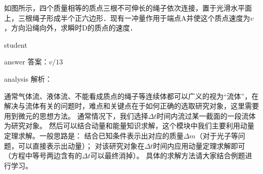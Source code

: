  
 \begin{example}
 	如图所示，四个质量相等的质点三根不可伸长的绳子依次连接，置于光滑水平面上，三根绳子形成半个正六边形．现有一冲量作用于端点A并使这个质点速度为$ v $，方向沿绳向外，求瞬时D的质点的速度．
 	
 	\begin{taggedblock}{student}
 		\vspace*{2cm}
 	\end{taggedblock}
 	
 	
 	\begin{taggedblock}{answer}
 		答案：$ v/13 $
 	\end{taggedblock}
 	
 	
 	\begin{taggedblock}{analysis}
 		解析：
 	\end{taggedblock}
 \end{example}
 
 
 
通常气体流、液体流、不能看成质点的绳子等连续体都可以广义的视为“流体”，在解决与流体有关的问题时，难点和关键点在于如何正确的选取研究对象，这里需要用到微元的思想方法。
通常情况下，我们选择$ \Delta t $时间内流过某一截面的一段流体为研究对象。
然后可以结合动量和能量知识求解，这个模块中我们主要利用动量定理求解。一般思路是：
结合已知条件表示出对应的质量$ \Delta m $（对于光子等问题，可以直接表示出动量）；
对该研究对象在$ \Delta t $时间内应用动量定理求解即可（方程中等号两边含有的$ \Delta t $可以最终消掉）。
具体的求解方法请大家结合例题进行学习。



